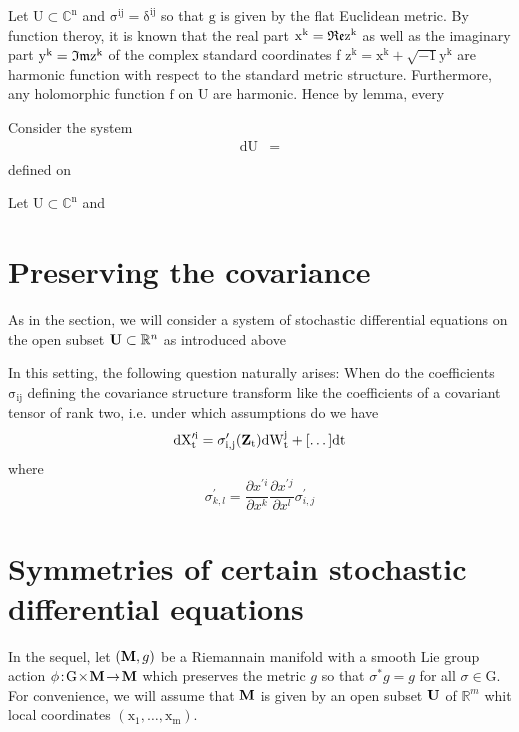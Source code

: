 \documentclass[11pt,english]{smfart}
\newcommand{\M}{{\bf{M}}}
\newcommand{\G}{{\textrm{G}}}
\newcommand{\U}{{\bf{U}}}
\newcommand{\Rm}{{\mathbb{R}}^{m}}
\newcommand{\dbp}{\!:\!}
\newcommand{\arr}{\!\rightarrow\!}
\newcommand{\tim}{\!\times\!}
\newcommand{\Z}{{\bf{Z}_{\textrm{t}}}}
\begin{document}
\begin{exem} Let $\mathrm{U\subset\mathbb{C}^{n}}$ and $\mathrm{\sigma^{ij}=\delta^{ij}}$ so that $\mathrm{g}$ is given by the flat Euclidean metric. By function theroy, it is known that the real part $\mathrm{x^{k}=\frak{Re} z^{k}}$ as well as the imaginary part $\mathrm{y^{k}=\frak{Im} z^{k}}$ of the complex standard coordinates f $\mathrm{z^{k}= x^{k}+\sqrt{-1}y^{k}}$ are harmonic function with respect to the standard metric structure. Furthermore, any holomorphic function $\mathrm{f}$ on $\mathrm{U}$ are harmonic. Hence by lemma, every

Consider the system 
\begin{equation}
\begin{split}
\mathrm{dU}&=\\
\end{split}
\end{equation}
defined on 
\end{exem}


\begin{exem} Let $\mathrm{U\subset\mathbb{C}^{n}}$ and  
\end{exem}

\section{Preserving the covariance}
As in the section, we will consider a system of stochastic differential equations on the open subset $\U\subset \mathbb{R}^{n}$ as introduced above

 In this setting, the following question naturally arises: When do the coefficients $\mathrm{\sigma_{ij}}$ defining the covariance structure transform like the coefficients of a  covariant tensor of rank two, i.e. under which assumptions do we have  
\begin{equation}
\mathrm{d X^{\prime i}_{t}= \sigma^{\prime}_{i,j}(\Z)dW^{j}_{t}+[\dots]dt}
\end{equation} where
\begin{equation}
 \sigma^{\prime}_{k,l} = \frac{\partial x^{\prime i}}{\partial x^{k}} \frac{\partial x^{\prime j}}{\partial x^{l}} \sigma^{\prime}_{i,j}
\end{equation}
    

\section{Symmetries of certain stochastic differential equations}
In the sequel, let $(\M, g)$ be a Riemannain manifold with a smooth Lie group action $\phi\dbp\G\tim\M\arr\M$ which preserves the metric $g$ so that $\sigma^{*}g=g$ for all $\sigma\in \G$. For convenience, we will assume that $\M$ is given by an open subset $\U$ of $\Rm$ whit local coordinates $\mathrm{(x_1,\dots,x_m)}$. 
\end{document}
